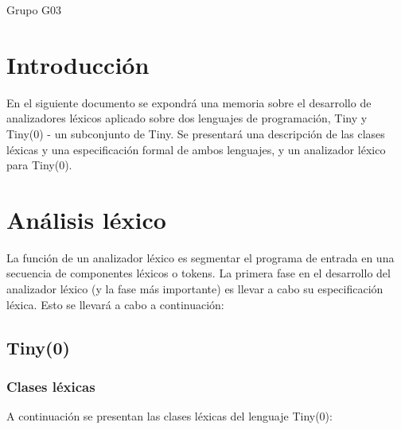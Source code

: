 \documentclass[11pt]{article}
\begin{document}
\maketitle
\thispagestyle{empty}
    \begin{center}
        \large Grupo G03
    \end{center}

    \newpage

    \section{Introducción}
        En el siguiente documento se expondrá una memoria sobre el desarrollo de analizadores léxicos aplicado sobre dos lenguajes de programación, Tiny y Tiny(0) - un subconjunto de Tiny.
        Se presentará una descripción de las clases léxicas y una especificación formal de ambos lenguajes, y un analizador léxico para Tiny(0).

    \section{Análisis léxico}
    La función de un analizador léxico es segmentar el programa de entrada en una secuencia de componentes léxicos o tokens. La primera fase en el desarrollo del analizador léxico (y la fase
más importante) es llevar a cabo su especificación léxica. Esto se llevará a cabo a continuación:

    \subsection{Tiny(0)}
    \subsubsection{Clases léxicas}
        A continuación se presentan las clases léxicas del lenguaje Tiny(0):
\end{document}
